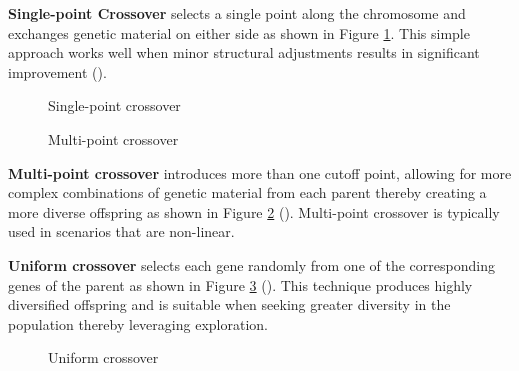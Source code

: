 \parbreak\noindent \textbf{Single-point Crossover} selects a single point along the chromosome and exchanges genetic material on either side as shown in Figure \ref{fig:singlepoint}. This simple approach works well when minor structural adjustments results in significant improvement (\cite{intelligentOptimization}).
	
\parbreak
\begin{figure}[H] %
	\centering %
	\caption{Single-point crossover}
	\label{fig:singlepoint} %
\end{figure}

\parbreak
\begin{figure}[H] %
	\centering %
	\caption{Multi-point crossover}
	\label{fig:multipoint} %
\end{figure}

\parbreak\noindent \textbf{Multi-point crossover} introduces more than one cutoff point, allowing for more complex combinations of genetic material from each parent thereby creating a more diverse offspring as shown in Figure \ref{fig:multipoint} (\cite{crossoverMethods}). Multi-point crossover is typically used in scenarios that are non-linear. 

\parbreak\noindent \textbf{Uniform crossover} selects each gene randomly from one of the corresponding genes of the parent as shown in Figure \ref{fig:uniform} (\cite{crossoverMethods}). This technique produces highly diversified offspring and is suitable when seeking greater diversity in the population thereby leveraging exploration.

\parbreak
\begin{figure}[th] %
	\centering %
	\caption{Uniform crossover}
	\label{fig:uniform} %
\end{figure}

